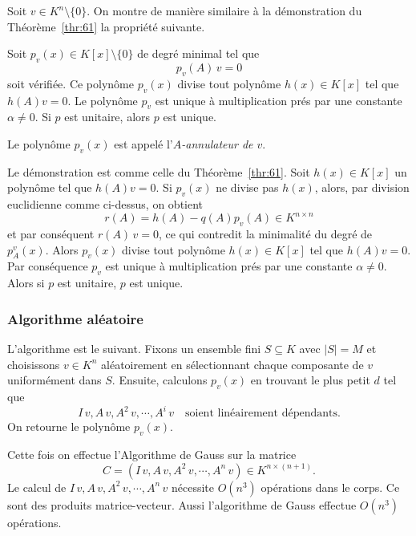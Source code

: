 Soit $v \in K^n \setminus\{0\}$. On montre de manière similaire à la démonstration du Théorème~\ref{thr:61} la propriété suivante.

\begin{theorem}
  \label{thr:64}
  Soit  $p_v(x) \in K[x] \setminus \{0\}$ de degré minimal  tel que
\begin{equation}
  \label{eq:2}
    p_v(A)\, v = 0
  \end{equation}
  soit vérifiée. Ce polynôme $p_v(x)$ divise tout polynôme $h(x) \in K[x]$ tel que $h(A)v = 0$.
Le polynôme $p_v$ est unique à multiplication prés par une constante $α ≠0$.
  Si $p$ est unitaire, alors $p$ est unique. 
\end{theorem}

Le polynôme $p_v(x)$ est appelé l'\emph{$A$-annulateur de $v$}.

Le démonstration est comme celle du Théorème~\ref{thr:61}.  Soit $h(x) \in K[x]$ un polynôme tel que $h(A)v = 0$. Si $p_v(x)$ ne divise pas $h(x)$, alors, par division euclidienne comme ci-dessus, on obtient
  \begin{displaymath}
    r(A) = h(A) - q(A) p_v(A) ∈ K^{n ×n}
  \end{displaymath}
  et par conséquent $r(A)\,v = 0$, ce qui contredit la minimalité du degré de $p_A^v(x)$. Alors $p_v(x)$ divise tout polynôme $h(x) \in K[x]$ tel que $h(A)v = 0$. Par conséquence 
 $p_v$ est unique à multiplication prés par une constante $α ≠0$. 
 Alors  si $p$ est unitaire,  $p$ est unique. 

  \subsubsection{Algorithme aléatoire}

  L'algorithme est le suivant. Fixons un ensemble fini $S \subseteq K$ avec $|S| = M$ et choisissons $v \in K^n$ aléatoirement en sélectionnant chaque composante de $v$ uniformément dans $S$. Ensuite, calculons $p_v(x)$ en trouvant le plus petit $d$ tel que
  \begin{displaymath}
    I \,v, A\,v, A^2\,v, \cdots, A^i\,v \quad \text{soient linéairement dépendants.}
  \end{displaymath}
  On retourne le polynôme $p_v(x)$.

  Cette fois on effectue l'Algorithme de Gauss sur la matrice
  \begin{equation}
    \label{eq:63}
    C = \left(  I \,v, A\,v, A^2\,v, \cdots, A^n\,v \right) ∈ K^{n × (n+1)}. 
  \end{equation}
  Le calcul de $I \,v, A\,v, A^2\,v, \cdots, A^n \,v$ nécessite $O(n^3)$ opérations dans le corps. Ce sont des produits matrice-vecteur.
  Aussi l'algorithme de Gauss effectue 
  $O(n^3)$ opérations.  


